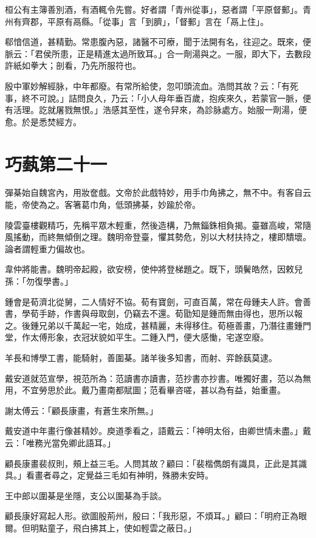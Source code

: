 桓公有主簿善別酒，有酒輒令先嘗。好者謂「青州從事」，惡者謂「平原督郵」。青州有齊郡，平原有鬲縣。「從事」言「到臍」，「督郵」言在「鬲上住」。

郗愔信道，甚精勤。常患腹內惡，諸醫不可療，聞于法開有名，往迎之。既來，便脈云：「君侯所患，正是精進太過所致耳。」合一劑湯與之。一服，即大下，去數段許紙如拳大；剖看，乃先所服符也。

殷中軍妙解經脉，中年都廢。有常所給使，忽叩頭流血。浩問其故？云：「有死事，終不可說。」詰問良久，乃云：「小人母年垂百歲，抱疾來久，若蒙官一脈，便有活理。訖就屠戮無恨。」浩感其至性，遂令舁來，為診脉處方。始服一劑湯，便愈。於是悉焚經方。



\chapter{巧蓺第二十一}

彈棊始自魏宮內，用妝奩戲。文帝於此戲特妙，用手巾角拂之，無不中。有客自云能，帝使為之。客箸葛巾角，低頭拂棊，妙踰於帝。

陵雲臺樓觀精巧，先稱平眾木輕重，然後造構，乃無錙銖相負揭。臺雖高峻，常隨風搖動，而終無傾倒之理。魏明帝登臺，懼其勢危，別以大材扶持之，樓即穨壞。論者謂輕重力偏故也。

韋仲將能書。魏明帝起殿，欲安榜，使仲將登梯題之。既下，頭鬢皓然，因敕兒孫：「勿復學書。」

鍾會是荀濟北從舅，二人情好不協。荀有寶劍，可直百萬，常在母鍾夫人許。會善書，學荀手跡，作書與母取劍，仍竊去不還。荀勖知是鍾而無由得也，思所以報之。後鍾兄弟以千萬起一宅，始成，甚精麗，未得移住。荀極善畫，乃潛往畫鍾門堂，作太傅形象，衣冠狀貌如平生。二鍾入門，便大感慟，宅遂空廢。

羊長和博學工書，能騎射，善圍棊。諸羊後多知書，而射、弈餘蓺莫逮。

戴安道就范宣學，視范所為：范讀書亦讀書，范抄書亦抄書。唯獨好畫，范以為無用，不宜勞思於此。戴乃畫南都賦圖；范看畢咨嗟，甚以為有益，始重畫。

謝太傅云：「顧長康畫，有蒼生來所無。」

戴安道中年畫行像甚精妙。庾道季看之，語戴云：「神明太俗，由卿世情未盡。」戴云：「唯務光當免卿此語耳。」

顧長康畫裴叔則，頰上益三毛。人問其故？顧曰：「裴楷儁朗有識具，正此是其識具。」看畫者尋之，定覺益三毛如有神明，殊勝未安時。

王中郎以圍棊是坐隱，支公以圍棊為手談。

顧長康好寫起人形。欲圖殷荊州，殷曰：「我形惡，不煩耳。」顧曰：「明府正為眼爾。但明點童子，飛白拂其上，使如輕雲之蔽日。」

